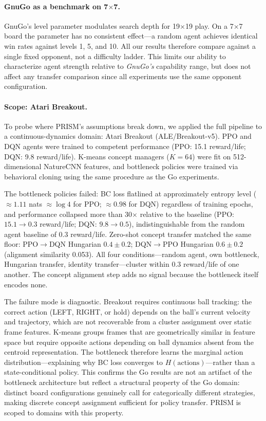 \documentclass[11pt,a4paper]{article}
\begin{document}
\paragraph{GnuGo as a benchmark on 7$\times$7.}
GnuGo's level parameter modulates search depth for 19$\times$19 play. On a 7$\times$7 board the parameter has no consistent effect---a random agent achieves identical win rates against levels 1, 5, and 10. All our results therefore compare against a single fixed opponent, not a difficulty ladder. This limits our ability to characterize agent strength relative to \emph{GnuGo's} capability range, but does not affect any transfer comparison since all experiments use the same opponent configuration.

\paragraph{Scope: Atari Breakout.}
To probe where PRISM's assumptions break down, we applied the full pipeline to a continuous-dynamics domain: Atari Breakout (ALE/Breakout-v5). PPO and DQN agents were trained to competent performance (PPO: 15.1 reward/life; DQN: 9.8 reward/life). K-means concept managers ($K{=}64$) were fit on 512-dimensional NatureCNN features, and bottleneck policies were trained via behavioral cloning using the same procedure as the Go experiments.

The bottleneck policies failed: BC loss flatlined at approximately entropy level (${\approx}1.11$ nats ${\approx}\log 4$ for PPO; ${\approx}0.98$ for DQN) regardless of training epochs, and performance collapsed more than 30$\times$ relative to the baseline (PPO: $15.1\to 0.3$ reward/life; DQN: $9.8\to 0.5$), indistinguishable from the random agent baseline of 0.3 reward/life. Zero-shot concept transfer matched the same floor: PPO$\to$DQN Hungarian $0.4 \pm 0.2$; DQN$\to$PPO Hungarian $0.6 \pm 0.2$ (alignment similarity 0.053). All four conditions---random agent, own bottleneck, Hungarian transfer, identity transfer---cluster within 0.3 reward/life of one another. The concept alignment step adds no signal because the bottleneck itself encodes none.

The failure mode is diagnostic. Breakout requires continuous ball tracking: the correct action (LEFT, RIGHT, or hold) depends on the ball's current velocity and trajectory, which are not recoverable from a cluster assignment over static frame features. K-means groups frames that are geometrically similar in feature space but require opposite actions depending on ball dynamics absent from the centroid representation. The bottleneck therefore learns the marginal action distribution---explaining why BC loss converges to $H(\text{actions})$---rather than a state-conditional policy. This confirms the Go results are not an artifact of the bottleneck architecture but reflect a structural property of the Go domain: distinct board configurations genuinely call for categorically different strategies, making discrete concept assignment sufficient for policy transfer. PRISM is scoped to domains with this property.
\end{document}
